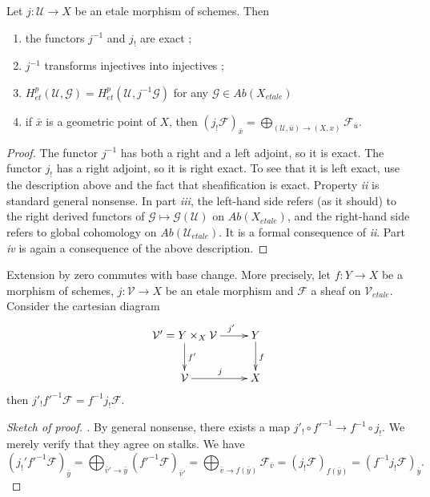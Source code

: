 \begin{proposition}
\label{proposition-describe-jshriek}
Let $j : \mathcal{U} \to X$ be an etale morphism of schemes. Then
\begin{enumerate}
\item the functors $j^{-1}$ and $j_!$ are exact ;
\item $j^{-1}$ transforms injectives into injectives ;
\item $H_{et}^p(\mathcal{U}, \mathcal{G})= H_{et}^p(\mathcal{U},
j^{-1}\mathcal{G})$ for any $\mathcal{G} \in \textit{Ab}(X_{etale})$
\item if $\bar x$ is a geometric point of $X$, then
$\left(j_!\mathcal{F}\right)_{\bar x} =\displaystyle \bigoplus_{(\mathcal{U},
\bar u) \to (X, x)} \mathcal{F}_{\bar{u}}$.
\end{enumerate}
\end{proposition}

\begin{proof}
The functor $j^{-1}$ has both a right and a left adjoint, so it is exact. The
functor $j_!$ has a right adjoint, so it is right exact. To see that it is left
exact, use the description above and the fact that sheafification is exact.
Property {\it ii} is standard general nonsense. In part {\it iii}, the
left-hand side refers (as it should) to the right derived functors of
$\mathcal{G}\mapsto \mathcal{G}(\mathcal{U})$ on $\textit{Ab}(X_{etale})$, and 
the
right-hand side refers to global cohomology on 
$\textit{Ab}(\mathcal{U}_{etale})$.
It is a formal consequence of {\it ii}. Part {\it iv} is again a consequence of
the above description.
\end{proof}

\begin{lemma}
\label{lemma-shriek-base-change}
Extension by zero commutes with base change. More precisely, let $f: Y \to X$
be a morphism of schemes, $j: \mathcal{V} \to X$ be an etale morphism and
$\mathcal{F}$ a sheaf on $\mathcal{V}_{etale}$. Consider the cartesian diagram
$$
\xymatrix{
{\mathcal{V}'=Y\times_X \mathcal{V}} \ar^{f'}[d] \ar^{\qquad j'}[r] & {Y}
\ar^{f}[d] \\
{\mathcal{V}} \ar^{j}[r] & {X}
}
$$
then $j'_! f'^{-1}\mathcal{F} = f^{-1}j_!\mathcal{F}$.
\end{lemma}

\begin{proof}[Sketch of proof. ]
By general nonsense, there exists a map $j'_! \circ f'^{-1} \to f^{-1}\circ
j_!$. We merely verify that they agree on stalks. We have
$$
\left(j_!'f'^{-1}\mathcal{F}\right)_{\bar y} =
\bigoplus_{\bar v' \to \bar y} (f'^{-1}\mathcal{F})_{\bar v'} =
\bigoplus_{\bar v \to f(\bar y)} \mathcal{F}_{\bar v} =
(j_!\mathcal{F})_{f(\bar y)} =
(f^{-1}j_!\mathcal{F})_{\bar y}.
$$
\end{proof}

